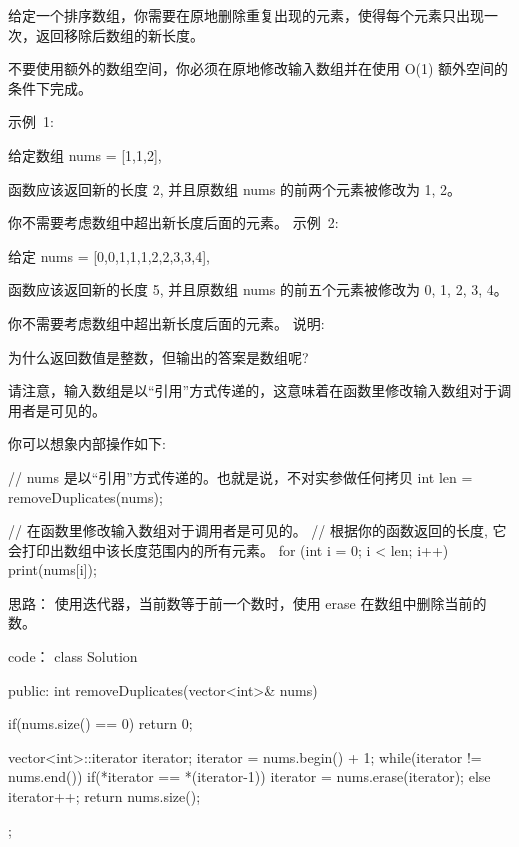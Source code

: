 给定一个排序数组，你需要在原地删除重复出现的元素，使得每个元素只出现一次，返回移除后数组的新长度。

不要使用额外的数组空间，你必须在原地修改输入数组并在使用 O(1) 额外空间的条件下完成。

示例 1:

给定数组 nums = [1,1,2], 

函数应该返回新的长度 2, 并且原数组 nums 的前两个元素被修改为 1, 2。 

你不需要考虑数组中超出新长度后面的元素。
示例 2:

给定 nums = [0,0,1,1,1,2,2,3,3,4],

函数应该返回新的长度 5, 并且原数组 nums 的前五个元素被修改为 0, 1, 2, 3, 4。

你不需要考虑数组中超出新长度后面的元素。
说明:

为什么返回数值是整数，但输出的答案是数组呢?

请注意，输入数组是以“引用”方式传递的，这意味着在函数里修改输入数组对于调用者是可见的。

你可以想象内部操作如下:

// nums 是以“引用”方式传递的。也就是说，不对实参做任何拷贝
int len = removeDuplicates(nums);

// 在函数里修改输入数组对于调用者是可见的。
// 根据你的函数返回的长度, 它会打印出数组中该长度范围内的所有元素。
for (int i = 0; i < len; i++) {
    print(nums[i]);
}


























思路：
使用迭代器，当前数等于前一个数时，使用 erase 在数组中删除当前的数。



























code：
class Solution {
public:
    int removeDuplicates(vector<int>& nums) {
        if(nums.size() == 0) return 0;
        
        vector<int>::iterator iterator;
        iterator = nums.begin() + 1;
        while(iterator != nums.end())
        {
            if(*iterator == *(iterator-1))
            {
                iterator = nums.erase(iterator);
            }
            else iterator++;
        }
        return nums.size();
    }
};
